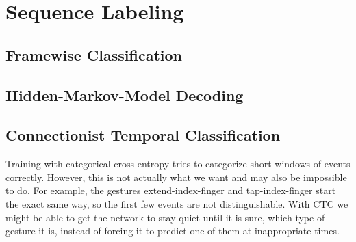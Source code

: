 \chapter{Sequence Labeling}
\label{cha:sequence-labeling}

\section{Framewise Classification}
\label{sec:frame-wise-class}

\section{Hidden-Markov-Model Decoding}
\label{sec:hidden-markov-model}

\section{Connectionist Temporal Classification}
\label{sec:conn-temp-class}

Training with categorical cross entropy tries to categorize short windows of events correctly.
However, this is not actually what we want and may also be impossible to do.
For example, the gestures extend-index-finger and tap-index-finger start the exact same way, so the first few events are not distinguishable.
With CTC we might be able to get the network to stay quiet until it is sure, which type of gesture it is, instead of forcing it to predict one of them at inappropriate times.
